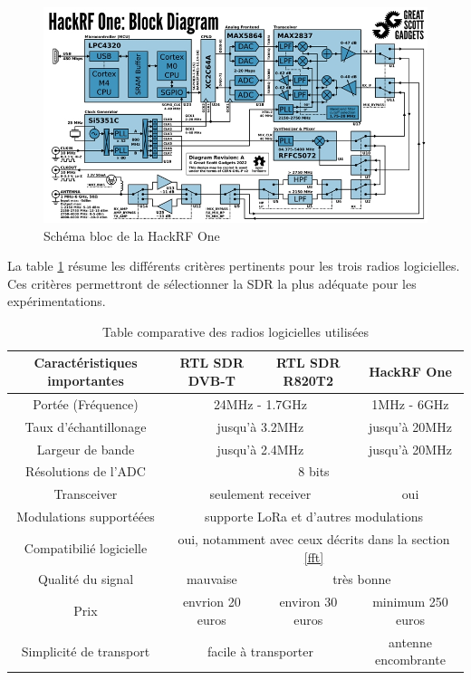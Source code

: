 \begin{figure}[h]
\centering

\includegraphics[scale=0.8]{images/SBhackrf.png}
\caption{Schéma bloc de la HackRF One}\label{term3001}
\end{figure}


La table \ref{table1} résume les différents critères pertinents pour les trois radios logicielles. Ces critères permettront de sélectionner la SDR la plus adéquate pour les expérimentations.


\begin{table}[h]
\centering
\begin{adjustbox}{width=1.2\textwidth}
\begin{tabular}{|c|c|c|c|}
\hline
\multicolumn{1}{|c|}{Caractéristiques importantes} & \multicolumn{1}{c|}{RTL SDR DVB-T} & \multicolumn{1}{c|}{RTL SDR R820T2} & \multicolumn{1}{c|}{HackRF One}\\
\hline
Portée (Fréquence) & \multicolumn{2}{c|}{24MHz - 1.7GHz} & 1MHz - 6GHz \\
\hline
Taux d'échantillonage & \multicolumn{2}{c|}{jusqu'à 3.2MHz} & jusqu'à 20MHz \\
\hline
Largeur de bande & \multicolumn{2}{c|}{jusqu'à 2.4MHz} & jusqu'à 20MHz  \\
\hline
Résolutions de l'ADC & \multicolumn{3}{c|}{8 bits} \\
\hline
Transceiver & \multicolumn{2}{c|}{seulement receiver} & oui \\
\hline
Modulations supportéées & \multicolumn{3}{c|}{supporte LoRa et d'autres modulations} \\
\hline
Compatibilié logicielle & \multicolumn{3}{c|}{oui, notamment avec ceux décrits dans la section \ref{fft}} \\
\hline
Qualité du signal & mauvaise &\multicolumn{2}{c|}{très bonne}\\
\hline
Prix & envrion 20 euros & environ 30 euros & minimum 250 euros \\
\hline
Simplicité de transport & \multicolumn{2}{c|}{facile à transporter} & antenne encombrante \\
\hline
\end{tabular}
\end{adjustbox}
\caption{Table comparative des radios logicielles utilisées}
\label{table1}
\end{table}




